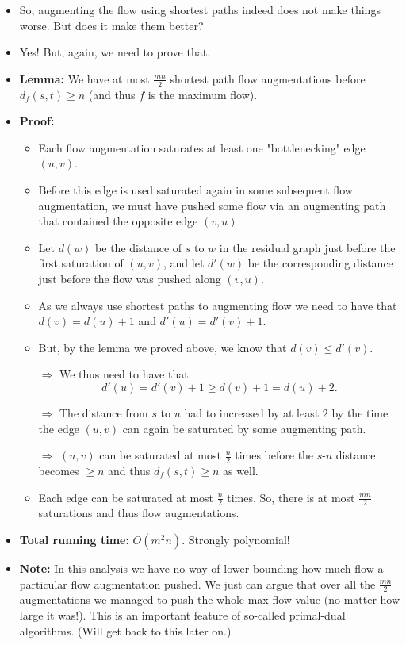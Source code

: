\documentclass{article}
\begin{document}
\begin{itemize}

\item So, augmenting the flow using shortest paths indeed does not make things worse.  But does it make them better?

\item Yes! But, again, we need to prove that.

\item {\bf Lemma:} We have at most $\frac{mn}{2}$ shortest path flow augmentations before $d_f(s,t)\geq n$ (and thus $f$ is the maximum flow).

\item  \textbf{Proof:}
\begin{itemize}
\item Each flow augmentation saturates at least one "bottlenecking" edge $(u,v)$. 
\item Before this edge is used saturated again in some subsequent flow augmentation, we must have pushed some flow via an augmenting path that contained the opposite edge $(v,u)$. 
\item Let $d(w)$ be the distance of $s$ to $w$ in the residual graph just before the first saturation of $(u,v)$, and let $d'(w)$ be the corresponding distance just before the flow was pushed along $(v,u)$. 
\item As we always use shortest paths to augmenting flow we need to have that $d(v)=d(u)+1$ and $d'(u)=d'(v)+1$. 
\item But, by the lemma we proved above, we know that $d(v)\leq d'(v)$. 

$\Rightarrow$ We thus need to have that 
\[
d'(u)=d'(v)+1\geq d(v)+1 = d(u)+2.
\]

$\Rightarrow$ The distance from $s$ to $u$ had to increased by at least $2$ by the time the edge $(u,v)$ can again be saturated by some augmenting path. 

$\Rightarrow$ $(u,v)$ can be saturated at most $\frac{n}{2}$ times before the $s$-$u$ distance becomes $\geq n$ and thus $d_f(s,t)\geq n$ as well. 

\item Each edge can be saturated at most $\frac{n}{2}$ times. So, there is at most $\frac{mn}{2}$ saturations and thus flow augmentations.
\end{itemize}

\item \textbf{Total running time:} $O(m^2 n)$. Strongly polynomial! 

\item \textbf{Note:} In this analysis we have no way of lower bounding how much flow a particular flow augmentation pushed. We just can argue that over all the $\frac{mn}{2}$ augmentations we managed to push the whole max flow value (no matter how large it was!).  This is an important feature of so-called primal-dual algorithms. (Will get back to this later on.)

\end{itemize}
\end{document}
